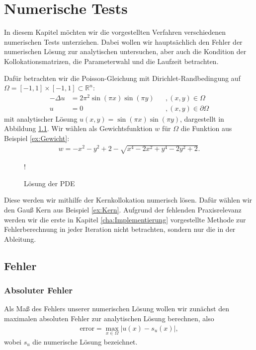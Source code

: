 \chapter{Numerische Tests}
\label{cha:NumerischeTests}

In diesem Kapitel möchten wir die vorgestellten Verfahren verschiedenen numerischen Tests unterziehen. Dabei wollen wir hauptsächlich den Fehler der numerischen Lösung zur analytischen untersuchen, aber auch die Kondition der Kollokationsmatrizen, die Parameterwahl und die Laufzeit betrachten.

Dafür betrachten wir die Poisson-Gleichung mit Dirichlet-Randbedingung auf $\Omega = [-1,1] \times [-1,1] \subset \mathbb{R}^n$:
\begin{align*}
- \Delta u &= 2\pi^2 \sin(\pi x)\sin(\pi y)&&, (x,y) \in \Omega\\
u &= 0&&, (x,y) \in \partial \Omega
\end{align*}
mit analytischer Lösung $u(x,y) = \sin(\pi x)\sin(\pi y)$, dargestellt in Abbildung \ref{fig:plot}. Wir wählen als Gewichtsfunktion $w$ für $\Omega$ die Funktion aus Beispiel \ref{ex:Gewicht}:
\begin{align*}
w = -x^2-y^2+2 - \sqrt{x^4 -2x^2 + y^4 -2y^2+2}.
\end{align*}
\begin{figure}[ht]
\centering
\resizebox {\columnwidth} {!} {

}
\caption{Lösung der \ac{PDE}}
\label{fig:plot}
\end{figure}

Diese werden wir mithilfe der Kernkollokation numerisch lösen. Dafür wählen wir den Gauß Kern aus Beispiel \ref{ex:Kern}. Aufgrund der fehlenden Praxisrelevanz werden wir die erste in Kapitel \ref{cha:Implementierung} vorgestellte Methode zur Fehlerberechnung in jeder Iteration nicht betrachten, sondern nur die in der Ableitung.

\section{Fehler}
\subsection{Absoluter Fehler}

Als Maß des Fehlers unserer numerischen Lösung wollen wir zunächst den maximalen absoluten Fehler zur analytischen Lösung berechnen, also
\begin{align*}
\text{error} = \max_{x \in \Omega} |u(x) - s_u (x)|,
\end{align*}
wobei $s_u$ die numerische Lösung bezeichnet.

